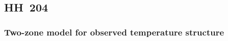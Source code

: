 \documentclass[twocolumn,linenumbers]{aastex63}
\newcommand{\eduardo}[1]{{\color{teal}E: #1}}
\begin{document}

\subsection{HH~204}
\label{subsec:disc_hh204}



 
\subsubsection{Two-zone model for observed temperature structure}
\end{document}
